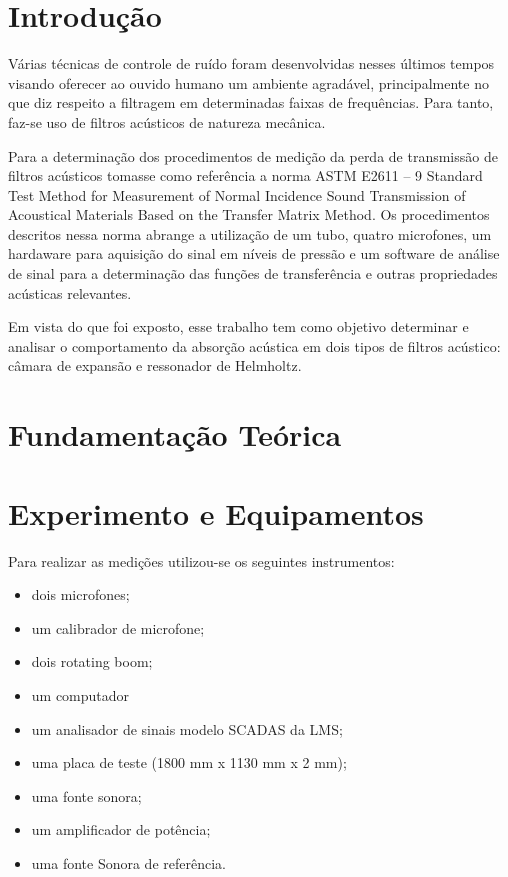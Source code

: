 \chapter{Introdução}\label{introducao}
Várias técnicas de controle de ruído foram desenvolvidas nesses últimos tempos visando oferecer ao ouvido humano um ambiente agradável, principalmente no que diz respeito a filtragem em determinadas faixas de frequências. Para tanto, faz-se uso de filtros acústicos de natureza mecânica.

Para a determinação dos procedimentos de medição da perda de transmissão de filtros acústicos tomasse como referência a norma ASTM E2611 – 9 Standard Test Method for Measurement of Normal Incidence Sound Transmission of Acoustical Materials Based on the Transfer Matrix Method. Os procedimentos descritos nessa norma abrange a utilização de um tubo, quatro microfones, um hardaware para aquisição do sinal em níveis de pressão e um software de análise de sinal para a determinação das funções de transferência e outras propriedades acústicas relevantes.

Em vista do que foi exposto, esse trabalho tem como objetivo determinar e analisar o comportamento da absorção acústica em dois tipos de filtros acústico: câmara de expansão e ressonador de Helmholtz.

\chapter{Fundamentação Teórica}\label{fundamentacao}


\chapter{Experimento e Equipamentos}\label{descricao}

Para realizar as medições utilizou-se os seguintes instrumentos:

\begin{itemize}
	\item dois microfones;
	\item um calibrador de microfone;
	\item dois rotating boom;
	\item um computador
	\item um analisador de sinais modelo SCADAS da LMS;
	\item uma placa de teste (1800 mm x 1130 mm x 2 mm);
	\item uma fonte sonora;
	\item um amplificador de potência;
	\item uma fonte Sonora de referência.
\end{itemize}

